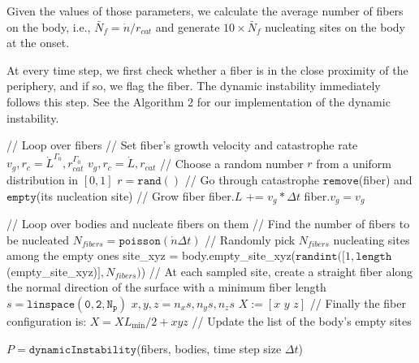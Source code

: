 \documentclass{article}
\begin{document}
Given the values of those parameters, we calculate the average number of fibers on the body, i.e., $\bar{N}_{f} = \dot{n}/r_{cat}$ and generate $10\times \bar{N}_f$ nucleating sites on the body at the onset.

At every time step, we first check whether a fiber is in the close proximity of the periphery, and if so, we flag the fiber. The dynamic instability immediately follows this step. See the Algorithm 2 for our implementation of the dynamic instability.
\begin{algorithm}[H]
\begin{algorithmic}
 \STATE // Loop over fibers
 \STATE // Set fiber's growth velocity and catastrophe rate
 \STATE $v_g, r_c = \dot{L}^{\Gamma_0}, r_{cat}^{\Gamma_0}$
 \ELSE
 \STATE $v_g, r_c = \dot{L}, r_{cat}$
 \ENDIF
 \STATE // Choose a random number $r$ from a uniform distribution in $[0, 1]$
 \STATE $r = \mathtt{rand}()$
 \STATE // Go through catastrophe
 \STATE $\mathtt{remove}$(fiber) and $\mathtt{empty}$(its nucleation site)
 \ELSE
 \STATE // Grow fiber
 \STATE fiber.$L$ += $v_g * \Delta t$
 \STATE fiber.$v_g = v_g$
 \ENDIF

 \ENDFOR

 \STATE // Loop over bodies and nucleate fibers on them
 \STATE // Find the number of fibers to be nucleated
 \STATE $N_{fibers} = \mathtt{poisson}(\dot{n} \Delta t)$
 \STATE // Randomly pick $N_{fibers}$ nucleating sites among the empty ones
 \STATE site\_xyz = body.empty\_site\_xyz($\mathtt{randint}([1, \mathtt{length}$(empty\_site\_xyz)$], N_{fibers})$)
 \STATE // At each sampled site, create a straight fiber along the normal direction of the surface with a minimum fiber length
 \STATE $s = \mathtt{linspace(0, 2, N_p)}$
 \STATE $x, y, z = n_x s, n_y s, n_z s$
 \STATE $X := [x\,\, y\,\, z]$
 \STATE // Finally the fiber configuration is:
 \STATE $X = X L_{\min}/2 + xyz$
 \STATE // Update the list of the body's empty sites
 \ENDFOR
 \ENDFOR
\end{algorithmic}
\caption{$P = \mathtt{dynamicInstability}$(fibers, bodies, time step size $\Delta t$)}
\end{algorithm}
\end{document}
